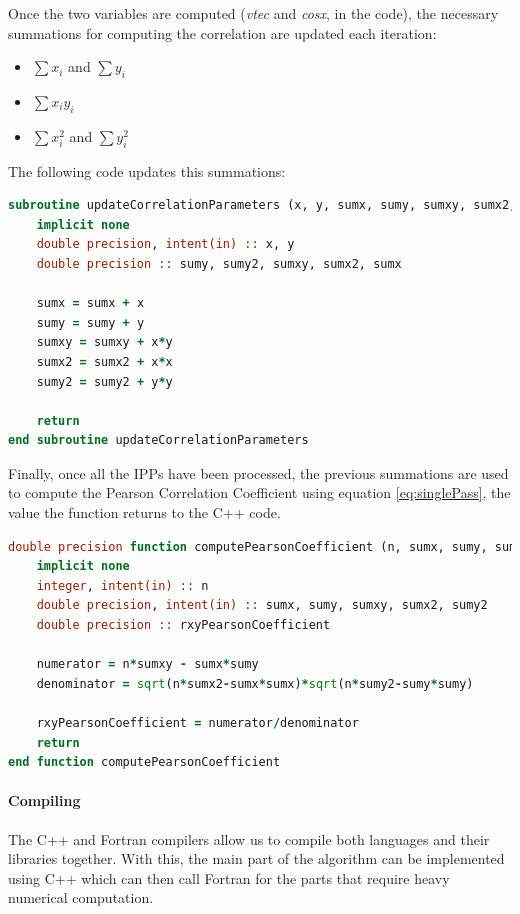 Once the two variables are computed (\textit{vtec} and \textit{cosx}, in the code), the necessary summations for computing the correlation are updated each iteration:

\begin{itemize}
	\item $\sum x_{i}$ and $\sum y_{i}$
	\item $\sum x_{i}y_{i}$
	\item $\sum x_{i}^{2}$ and $\sum y_{i}^{2}$
\end{itemize}

The following code updates this summations:

\begin{lstlisting}[language=Fortran, caption=Function to update the necessary summations]
subroutine updateCorrelationParameters (x, y, sumx, sumy, sumxy, sumx2, sumy2)
	implicit none
	double precision, intent(in) :: x, y
	double precision :: sumy, sumy2, sumxy, sumx2, sumx

	sumx = sumx + x
	sumy = sumy + y
	sumxy = sumxy + x*y
	sumx2 = sumx2 + x*x
	sumy2 = sumy2 + y*y

	return
end subroutine updateCorrelationParameters
\end{lstlisting}

Finally, once all the IPPs have been processed, the previous summations are used to compute the Pearson Correlation Coefficient using equation \ref{eq:singlePass}, the value the function returns to the C++ code.

\begin{lstlisting}[language=Fortran, caption=Function to compute the correlation coefficient using the summations]
double precision function computePearsonCoefficient (n, sumx, sumy, sumxy, sumx2, sumy2)
	implicit none
	integer, intent(in) :: n
	double precision, intent(in) :: sumx, sumy, sumxy, sumx2, sumy2 
	double precision :: rxyPearsonCoefficient

	numerator = n*sumxy - sumx*sumy
	denominator = sqrt(n*sumx2-sumx*sumx)*sqrt(n*sumy2-sumy*sumy)

	rxyPearsonCoefficient = numerator/denominator
	return
end function computePearsonCoefficient
\end{lstlisting}

\paragraph{Compiling}

The C++ and Fortran compilers allow us to compile both languages and their libraries together. With this, the main part of the algorithm can be implemented using C++ which can then call Fortran for the parts that require heavy numerical computation.


